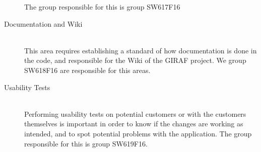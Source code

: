 \begin{description}
	The group responsible for this is group SW617F16
	\item[Documentation and Wiki] \hfill \\
	This area requires establishing a standard of how documentation is done in the code, and responsible for the Wiki of the GIRAF project. We group SW618F16 are responsible for this areas.
	\item[Usability Tests] \hfill \\
	Performing usability tests on potential customers or with the customers themselves is important in order to know if the changes are working as intended, and to spot potential problems with the application. The group responsible for this is group SW619F16.	
\end{description}


